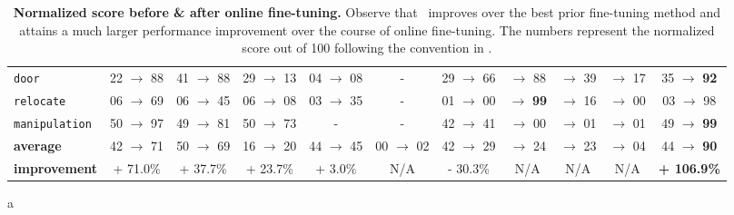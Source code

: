 \begin{table}[h]
{\begin{center}
{\begin{tabular}{l|c|c|c|c|c|c|c|c|c||c}
\texttt{door} & 22 $\rightarrow$ 88 & 41 $\rightarrow$ 88 & 29 $\rightarrow$ 13 & 04 $\rightarrow$ 08 & - & 29 $\rightarrow$ 66 &  $\rightarrow$ 88 &  $\rightarrow$ 39 &  $\rightarrow$ 17 & 35 $\rightarrow$ \textbf{92} \\
\texttt{relocate} & 06 $\rightarrow$ 69 & 06 $\rightarrow$ 45 & 06 $\rightarrow$ 08 & 03 $\rightarrow$ 35 & - & 01 $\rightarrow$ 00 &  $\rightarrow$ \textbf{99} &  $\rightarrow$ 16 &  $\rightarrow$ 00 & 03 $\rightarrow$ 98 \\  \hline
\texttt{manipulation} & 50 $\rightarrow$ 97 & 49 $\rightarrow$ 81 & 50 $\rightarrow$ 73 & - & - & 42 $\rightarrow$ 41 &  $\rightarrow$ 00 &  $\rightarrow$ 01 &  $\rightarrow$ 01 & 49 $\rightarrow$ \textbf{99} \\ \hline \hline
\textbf{average} & 42 $\rightarrow$ 71 & 50 $\rightarrow$ 69 & 16 $\rightarrow$ 20 & 44 $\rightarrow$ 45 & 00 $\rightarrow$ 02 & 42 $\rightarrow$ 29 &  $\rightarrow$ 24 &  $\rightarrow$ 23 &  $\rightarrow$ 04 & 44 $\rightarrow$ \textbf{90} \\ \hline
\textbf{improvement} & + 71.0\%  & + 37.7\%  & + 23.7\%  & + 3.0\%  & N/A  & - 30.3\%  & N/A &  N/A &  N/A & \textbf{+ 106.9\%}  \\
\end{tabular}}
\vspace{-0.15cm}
a\caption{\footnotesize{\textbf{Normalized score before \& after online fine-tuning.} Observe that \methodname\ improves over the best prior fine-tuning method and attains a much larger performance improvement over the course of online fine-tuning. The numbers represent the normalized score out of 100 following the convention in \citep{fu2020d4rl}.} \label{tab:performance}}
\end{center}
}
\end{table}

